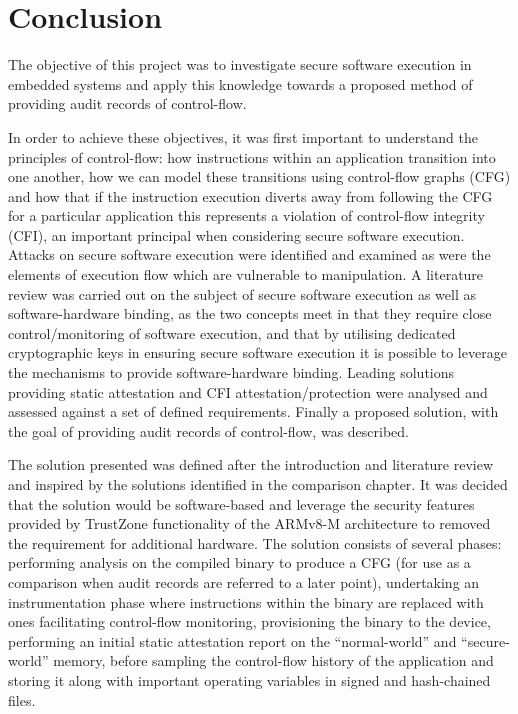 \section{Conclusion}

The objective of this project was to investigate secure software execution in embedded systems and apply this knowledge towards a proposed method of providing audit records of control-flow.

In order to achieve these objectives, it was first important to understand the principles of control-flow: how instructions within an application transition into one another, how we can model these transitions using control-flow graphs (CFG) and how that if the instruction execution diverts away from following the CFG for a particular application this represents a violation of control-flow integrity (CFI), an important principal when considering secure software execution. Attacks on secure software execution were identified and examined as were the elements of execution flow which are vulnerable to manipulation. A literature review was carried out on the subject of secure software execution as well as software-hardware binding, as the two concepts meet in that they require close control\slash monitoring of software execution, and that by utilising dedicated cryptographic keys in ensuring secure software execution it is possible to leverage the mechanisms to provide software-hardware binding. Leading solutions providing static attestation and CFI attestation\slash protection were analysed and assessed against a set of defined requirements. Finally a proposed solution, with the goal of providing audit records of control-flow, was described.

The solution presented was defined after the introduction and literature review and inspired by the solutions identified in the comparison chapter. It was decided that the solution would be software-based and leverage the security features provided by TrustZone functionality of the ARMv8-M architecture to removed the requirement for additional hardware. The solution consists of several phases: performing analysis on the compiled binary to produce a CFG (for use as a comparison when audit records are referred to a later point), undertaking an instrumentation phase where instructions within the binary are replaced with ones facilitating control-flow monitoring, provisioning the binary to the device, performing an initial static attestation report on the ``normal-world'' and ``secure-world'' memory, before sampling the control-flow history of the application and storing it along with important operating variables in signed and hash-chained files.

